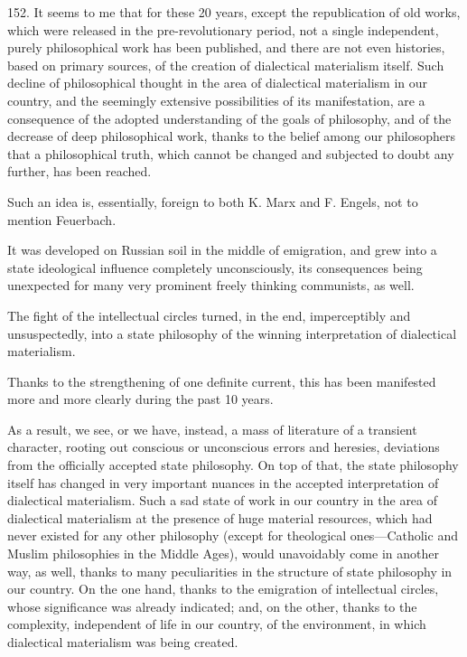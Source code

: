 152. It seems to me that for these 20 years, except the republication of old
works, which were released in the pre-revolutionary period, not a single
independent, purely philosophical work has been published, and there are not
even histories, based on primary sources, of the creation of dialectical
materialism itself.  Such decline of philosophical thought in the area
of dialectical materialism in our country, and the seemingly extensive
possibilities of its manifestation, are a consequence of the adopted
understanding of the goals of philosophy, and of the decrease of deep
philosophical work, thanks to the belief among our philosophers that a
philosophical truth, which cannot be changed and subjected to doubt any
further, has been reached.

Such an idea is, essentially, foreign to both K. Marx and F. Engels, not to
mention Feuerbach.

It was developed on Russian soil in the middle of emigration, and grew into a
state ideological influence completely unconsciously, its consequences being
unexpected for many very prominent freely thinking communists, as well.

The fight of the intellectual circles turned, in the end, imperceptibly and
unsuspectedly, into a state philosophy of the winning interpretation of
dialectical materialism.

Thanks to the strengthening of one definite current, this has been manifested
more and more clearly during the past 10 years.

As a result, we see, or we have, instead, a mass of literature of a transient
character, rooting out conscious or unconscious errors and heresies, deviations
from the officially accepted state philosophy.  On top of that, the state
philosophy itself has changed in very important nuances in the accepted
interpretation of dialectical materialism.  Such a sad state of work in our
country in the area of dialectical materialism at the presence of huge material
resources, which had never existed for any other philosophy (except for
theological ones---Catholic and Muslim philosophies in the Middle Ages), would
unavoidably come in another way, as well, thanks to many peculiarities in the
structure of state philosophy in our country.  On the one hand, thanks to the
emigration of intellectual circles, whose significance was already indicated;
and, on the other, thanks to the complexity, independent of life in our
country, of the environment, in which dialectical materialism was being
created.


